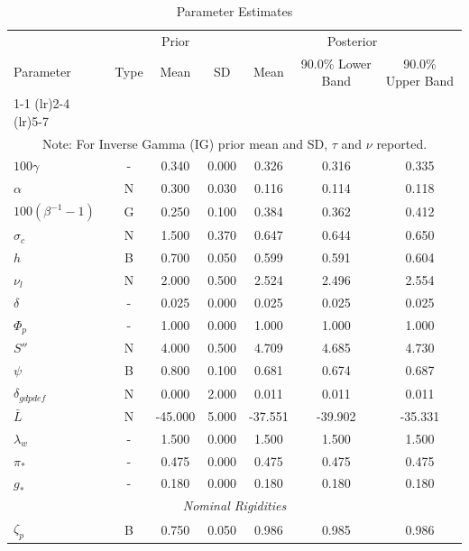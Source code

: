 \documentclass[12pt]{article}
\begin{document}
\pagestyle{empty}
\vspace*{.5cm}
{\small
\begin{longtable}{lcccccc}
\caption{Parameter Estimates}
\\ \hline
\multicolumn{1}{c}{} & \multicolumn{3}{c}{Prior} & \multicolumn{3}{c}{Posterior} \\
Parameter & Type & Mean & SD & Mean & 90.0\% {\tiny Lower Band} & 90.0\% {\tiny Upper Band} \\
\cmidrule(lr){1-1} \cmidrule(lr){2-4} \cmidrule(lr){5-7}
\endhead
\hline
\\ \multicolumn{7}{c}{\footnotesize Note: For Inverse Gamma (IG) prior mean and SD, $\tau$ and $\nu$ reported.}
\endfoot
\multicolumn{7}{c}{\textit{Steady State}} \\[3pt]
$100\gamma$ & - &    0.340 &    0.000 &    0.326 &    0.316 &    0.335 \\
$\alpha$ & N &    0.300 &    0.030 &    0.116 &    0.114 &    0.118 \\
$100(\beta^{-1} - 1)$ & G &    0.250 &    0.100 &    0.384 &    0.362 &    0.412 \\
$\sigma_{c}$ & N &    1.500 &    0.370 &    0.647 &    0.644 &    0.650 \\
$   h$ & B &    0.700 &    0.050 &    0.599 &    0.591 &    0.604 \\
$\nu_l$ & N &    2.000 &    0.500 &    2.524 &    2.496 &    2.554 \\
$\delta$ & - &    0.025 &    0.000 &    0.025 &    0.025 &    0.025 \\
$\Phi_p$ & - &    1.000 &    0.000 &    1.000 &    1.000 &    1.000 \\
$ S''$ & N &    4.000 &    0.500 &    4.709 &    4.685 &    4.730 \\
$\psi$ & B &    0.800 &    0.100 &    0.681 &    0.674 &    0.687 \\
$\delta_{gdpdef}$ & N &    0.000 &    2.000 &    0.011 &    0.011 &    0.011 \\
$\bar{L}$ & N &  -45.000 &    5.000 &  -37.551 &  -39.902 &  -35.331 \\
$\lambda_w$ & - &    1.500 &    0.000 &    1.500 &    1.500 &    1.500 \\
$\pi_*$ & - &    0.475 &    0.000 &    0.475 &    0.475 &    0.475 \\
$ g_*$ & - &    0.180 &    0.000 &    0.180 &    0.180 &    0.180 \\
\multicolumn{7}{c}{\textit{Nominal Rigidities}} \\[3pt]
$\zeta_p$ & B &    0.750 &    0.050 &    0.986 &    0.985 &    0.986 \\

\end{longtable}}
\end{document}
